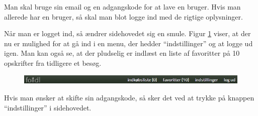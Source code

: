 Man skal bruge sin email og en adgangskode for at lave en bruger. Hvis man allerede har en bruger, så skal man blot logge ind med de rigtige oplysninger.

Når man er logget ind, så ændrer sidehovedet sig en smule. Figur \ref{fig:foodl-loggetind} viser, at der nu er mulighed for at gå ind i en menu, der hedder ``indstillinger'' og at logge ud igen. Man kan også se, at der pludselig er indlæst en liste af favoritter på 10 opskrifter fra tidligere et besøg.


\begin{figure}[H]
	\centering
	\includegraphics[scale=0.7]{billeder/foodl/header-login.jpg}
	\label{fig:foodl-loggetind}
\end{figure}

Hvis man ønsker at skifte sin adgangskode, så sker det ved at trykke på knappen ``indstillinger'' i sidehovedet.

